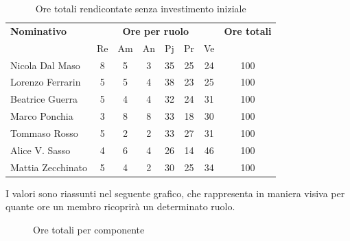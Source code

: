 \begin{table}[H]
	\centering
	\begin{tabular}{|l|c|c|c|c|c|c|c|}
		\hline
		\textbf{Nominativo} & 
		\multicolumn{6}{c|}{\textbf{Ore per ruolo}} & 
		\textbf{Ore totali} \\
		& Re & Am & An & Pj & Pr & Ve & \\
		\hline
		Nicola Dal Maso &8 &5 &3 &35 &25 &24 & 100 \\
		Lorenzo Ferrarin &5 &5 &4 &38 &23 &25 & 100 \\
		Beatrice Guerra &5 &4 &4 &32 &24 &31 & 100 \\
		Marco Ponchia &3 &8 &8 &33 &18 &30 & 100 \\
		Tommaso Rosso &5 &2 &2 &33 &27 &31 & 100 \\
		Alice V. Sasso &4 &6 &4 &26 &14 &46 & 100 \\
		Mattia Zecchinato &5 &4 &2 &30 &25 &34 & 100 \\
		\hline
	\end{tabular}
	\caption{Ore totali rendicontate senza investimento iniziale}
\end{table}
I valori sono riassunti nel seguente grafico, che rappresenta in maniera visiva per quante ore un membro ricoprirà un determinato ruolo.
\begin{figure}[H]
	\centering
	\caption{Ore totali per componente}
\end{figure}





